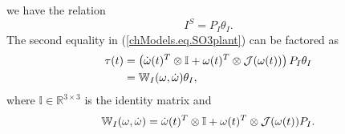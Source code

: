 %
we have the relation 
%
\begin{equation}\label{chModels.eq.IstackToTheta}
I^S=P_I\theta_I.
\end{equation}
%
The second equality in (\ref{chModels.eq.SO3plant}) can be factored as 
%
\begin{align}
  \tau(t)&= \left(\dot{\omega}(t)^T \otimes \mathbb{I}+\omega(t)^T
    \otimes \mathcal{J}(\omega(t))\right)P_I \theta_I        \nonumber \\
  &=\mathbb{W}_{I}(\omega,\dot{\omega}) \theta_I, \label{chModels.eq.SO3_LS}
\end{align}
%
\noindent where $\mathbb{I}\in\mathbb{R}^{3\times 3}$ is the identity
matrix and  
%
\begin{equation}
\mathbb{W}_{I}(\omega,\dot{\omega})=\dot{\omega}(t)^T \otimes
\mathbb{I}+\omega(t)^T \otimes \mathcal{J}(\omega(t))P_I.
\end{equation}